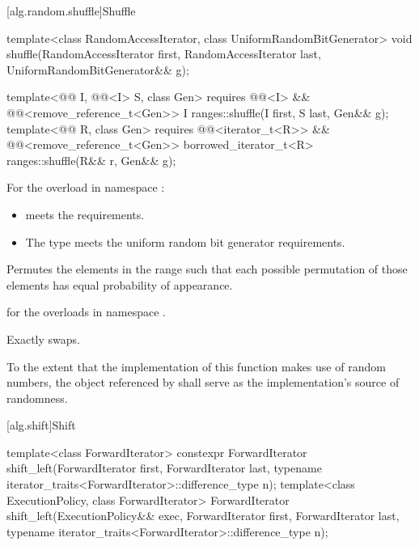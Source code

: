 [alg.random.shuffle]{Shuffle}

%
\begin{itemdecl}
template<class RandomAccessIterator, class UniformRandomBitGenerator>
  void shuffle(RandomAccessIterator first,
               RandomAccessIterator last,
               UniformRandomBitGenerator&& g);

template<@@ I, @@<I> S, class Gen>
  requires @@<I> &&
           @@<remove_reference_t<Gen>>
  I ranges::shuffle(I first, S last, Gen&& g);
template<@@ R, class Gen>
  requires @@<iterator_t<R>> &&
           @@<remove_reference_t<Gen>>
  borrowed_iterator_t<R> ranges::shuffle(R&& r, Gen&& g);
\end{itemdecl}

\begin{itemdescr}
\pnum
\expects
For the overload in namespace :
\begin{itemize}
\item
   meets
  the  requirements.
\item
  The type  meets
  the uniform random bit generator requirements.
\end{itemize}

\pnum
\effects
Permutes the elements in the range 
such that each possible permutation of those elements
has equal probability of appearance.

\pnum
\returns
{} for the overloads in namespace .

\pnum
\complexity
Exactly  swaps.

\pnum
\remarks
To the extent that the implementation of this function makes use
of random numbers, the object referenced by  shall serve as
the implementation's source of randomness.
\end{itemdescr}

[alg.shift]{Shift}

%
\begin{itemdecl}
template<class ForwardIterator>
  constexpr ForwardIterator
    shift_left(ForwardIterator first, ForwardIterator last,
               typename iterator_traits<ForwardIterator>::difference_type n);
template<class ExecutionPolicy, class ForwardIterator>
  ForwardIterator
    shift_left(ExecutionPolicy&& exec, ForwardIterator first, ForwardIterator last,
               typename iterator_traits<ForwardIterator>::difference_type n);
\end{itemdecl}

